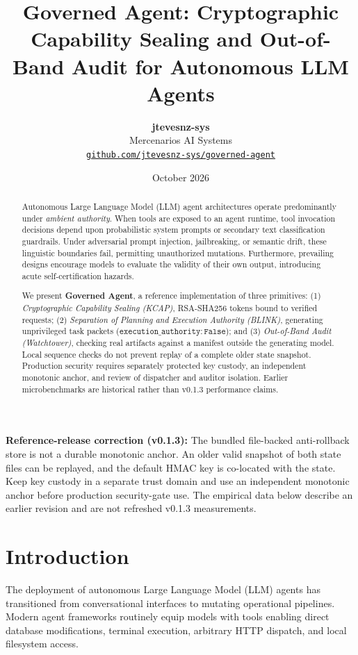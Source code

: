 \documentclass[11pt,a4paper]{article}
\title{\textbf{Governed Agent: Cryptographic Capability Sealing and Out-of-Band Audit for Autonomous LLM Agents}}
\author{
  \textbf{jtevesnz-sys} \\
  Mercenarios AI Systems \\
  \texttt{\href{https://github.com/jtevesnz-sys/governed-agent}{github.com/jtevesnz-sys/governed-agent}}
}
\date{October 2026}
\begin{document}
\maketitle
\noindent\textbf{Reference-release correction (v0.1.3):} The bundled file-backed anti-rollback store is not a durable monotonic anchor. An older valid snapshot of both state files can be replayed, and the default HMAC key is co-located with the state. Keep key custody in a separate trust domain and use an independent monotonic anchor before production security-gate use. The empirical data below describe an earlier revision and are not refreshed v0.1.3 measurements.\par\medskip

\begin{abstract}
Autonomous Large Language Model (LLM) agent architectures operate predominantly under \emph{ambient authority}. When tools are exposed to an agent runtime, tool invocation decisions depend upon probabilistic system prompts or secondary text classification guardrails. Under adversarial prompt injection, jailbreaking, or semantic drift, these linguistic boundaries fail, permitting unauthorized mutations. Furthermore, prevailing designs encourage models to evaluate the validity of their own output, introducing acute self-certification hazards. 

We present \textbf{Governed Agent}, a reference implementation of three primitives: (1) \emph{Cryptographic Capability Sealing (KCAP)}, RSA-SHA256 tokens bound to verified requests; (2) \emph{Separation of Planning and Execution Authority (BLINK)}, generating unprivileged task packets ($\mathtt{execution\_authority: False}$); and (3) \emph{Out-of-Band Audit (Watchtower)}, checking real artifacts against a manifest outside the generating model. Local sequence checks do not prevent replay of a complete older state snapshot. Production security requires separately protected key custody, an independent monotonic anchor, and review of dispatcher and auditor isolation. Earlier microbenchmarks are historical rather than v0.1.3 performance claims.
\end{abstract}

\section{Introduction}

The deployment of autonomous Large Language Model (LLM) agents has transitioned from conversational interfaces to mutating operational pipelines. Modern agent frameworks routinely equip models with tools enabling direct database modifications, terminal execution, arbitrary HTTP dispatch, and local filesystem access.
\end{document}

